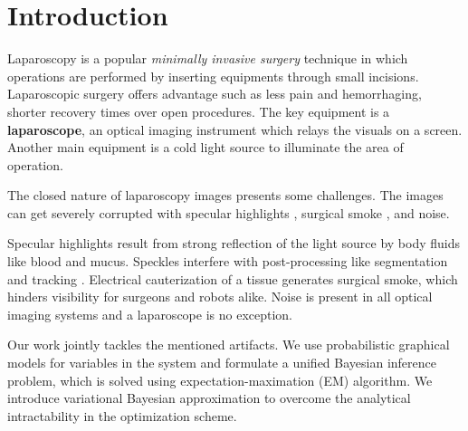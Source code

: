 
\newcommand{\etas}{\ensuremath{\eta_{\mathrm{s}}}}


\chapter{Introduction}

Laparoscopy is a popular \textit{minimally invasive surgery} technique in which operations are performed by inserting equipments through small incisions. Laparoscopic surgery offers advantage such as less pain and hemorrhaging, shorter recovery times over open procedures. The key equipment is a \textbf{laparoscope}, an optical imaging instrument which relays the visuals on a screen. Another main equipment is a cold light source to illuminate the area of operation.

The closed nature of laparoscopy images presents some challenges. The images can get severely corrupted with specular highlights \cite{stoyanov2005removing, saint2011detection}, surgical smoke \cite{barrett2003surgical}, and noise.

Specular highlights result from strong reflection of the light source by body fluids like blood and mucus. Speckles interfere with post-processing like segmentation \cite{prokopetc2015segmentation, voros2007segmentation} and tracking \cite{wolf2011tracking}. Electrical cauterization of a tissue generates surgical smoke, which hinders visibility for surgeons and robots alike. Noise is present in all optical imaging systems and a laparoscope is no exception.

Our work jointly tackles the mentioned artifacts. We use probabilistic graphical models for variables in the system and formulate a unified Bayesian inference problem, which is solved using expectation-maximation (EM) algorithm. We introduce variational Bayesian approximation to overcome the analytical intractability in the optimization scheme.







